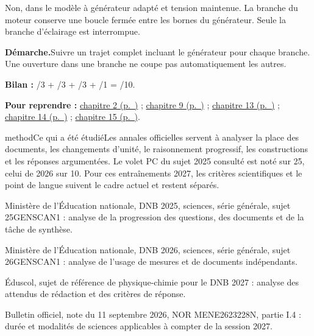 \par\noindent\begin{minipage}{\linewidth}Non, dans le modèle à générateur adapté et tension maintenue. La branche du moteur conserve une boucle fermée entre les bornes du générateur. Seule la branche d’éclairage est interrompue.\par\smallskip\textbf{Démarche.}\enspace Suivre un trajet complet incluant le générateur pour chaque branche. Une ouverture dans une branche ne coupe pas automatiquement les autres.\par{}\end{minipage}\par
{}
\par\noindent\begin{minipage}{\linewidth}{\small\textbf{Bilan :} /3 + /3 + /3 + /1 = /10.\par\textbf{Pour reprendre :} \hyperref[chap-2]{chapitre 2 (p.~\pageref*{chap-2})} ; \hyperref[chap-9]{chapitre 9 (p.~\pageref*{chap-9})} ; \hyperref[chap-13]{chapitre 13 (p.~\pageref*{chap-13})} ; \hyperref[chap-14]{chapitre 14 (p.~\pageref*{chap-14})} ; \hyperref[chap-15]{chapitre 15 (p.~\pageref*{chap-15})}.\par}\end{minipage}\par
{}
\label{sources-annales}
\begin{pcEncadre}{method}{Ce qui a été étudié}Les annales officielles servent à analyser la place des documents, les changements d’unité, le raisonnement progressif, les constructions et les réponses argumentées. Le volet PC du sujet 2025 consulté est noté sur 25, celui de 2026 sur 10. Pour ces entraînements 2027, les critères scientifiques et le point de langue suivent le cadre actuel et restent séparés.\end{pcEncadre}
\begin{questions}
\item Ministère de l’Éducation nationale, DNB 2025, sciences, série générale, sujet 25GENSCAN1 : analyse de la progression des questions, des documents et de la tâche de synthèse.
\item Ministère de l’Éducation nationale, DNB 2026, sciences, série générale, sujet 26GENSCAN1 : analyse de l’usage de mesures et de documents indépendants.
\item Éduscol, sujet de référence de physique-chimie pour le DNB 2027 : analyse des attendus de rédaction et des critères de réponse.
\item Bulletin officiel, note du 11 septembre 2026, NOR MENE2623228N, partie I.4 : durée et modalités de sciences applicables à compter de la session 2027.
\end{questions}
